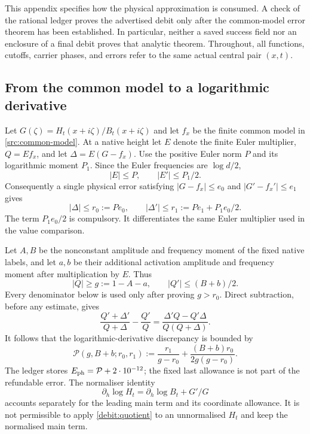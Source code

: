 \documentclass[11pt,a4paper]{article}
\theoremstyle{definition}
\theoremstyle{remark}
\begin{document}
This appendix specifies how the physical approximation is consumed. A
check of the rational ledger proves the advertised debit only after the
common-model error theorem has been established. In particular, neither a
saved success field nor an enclosure of a final debit proves that analytic
theorem. Throughout, all functions, cutoffs, carrier phases, and errors
refer to the same actual central pair $(x,t)$.

\subsection{From the common model to a logarithmic derivative}

Let $G(\zeta)=H_t(x+i\zeta)/B_t(x+i\zeta)$ and let $f_x$ be the
finite common model in \eqref{src:common-model}. At a native height let
$E$ denote the finite Euler multiplier, $Q=Ef_x$, and let
$\Delta=E(G-f_x)$. Use the positive Euler norm $P$ and its logarithmic
moment $P_1$. Since the Euler frequencies are $\log d/2$,
\[
 |E|\le P,\qquad |E'|\le P_1/2.
\]
Consequently a single physical error satisfying
$|G-f_x|\le e_0$ and $|G'-f_x'|\le e_1$ gives
\begin{equation}
 |\Delta|\le r_0:=Pe_0,\qquad
 |\Delta'|\le r_1:=Pe_1+P_1e_0/2.
 \label{debit:error-product}
\end{equation}
The term $P_1e_0/2$ is compulsory. It differentiates the same Euler
multiplier used in the value comparison.

Let $A,B$ be the nonconstant amplitude and frequency moment of the fixed
native labels, and let $a,b$ be their additional activation amplitude
and frequency moment after multiplication by $E$. Thus
\[
 |Q|\ge g:=1-A-a,\qquad |Q'|\le (B+b)/2.
\]
Every denominator below is used only after proving $g>r_0$. Direct
subtraction, before any estimate, gives
\[
 \frac{Q'+\Delta'}{Q+\Delta}-\frac{Q'}Q
 =\frac{\Delta'Q-Q'\Delta}{Q(Q+\Delta)}.
\]
It follows that the logarithmic-derivative discrepancy is bounded by
\begin{equation}
 \mathcal P(g,B+b;r_0,r_1)
 :=\frac{r_1}{g-r_0}
 +\frac{(B+b)r_0}{2g(g-r_0)}.
 \label{debit:quotient}
\end{equation}
The ledger stores $E_{\rm ph}=\mathcal P+2\cdot10^{-12}$; the fixed
last allowance is not part of the refundable error.
The normaliser identity
\[
 \partial_h\log H_t=\partial_h\log B_t+G'/G
\]
accounts separately for the leading main term and its coordinate
allowance. It is not permissible to apply \eqref{debit:quotient} to an
unnormalised $H_t$ and keep the normalised main term.
\end{document}
